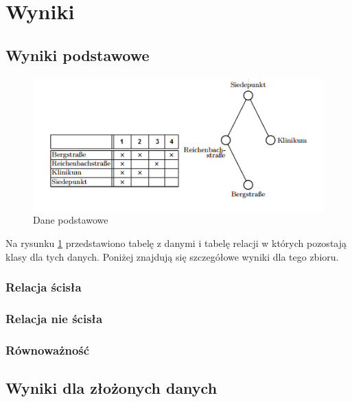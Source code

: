 \documentclass[a4paper,12pt]{article}
\begin{document}
\section{Wyniki}

\subsection{Wyniki podstawowe}

\begin{figure}[h!]
\begin{center}
\includegraphics[width=\textwidth]{img/dane.png}
\caption{Dane podstawowe}
\label{dane_podstawowe}
\end{center}
\end{figure}

Na rysunku \ref{dane_podstawowe} przedstawiono tabelę z danymi i tabelę relacji w których pozostają klasy dla tych danych. Poniżej znajdują się szczegółowe wyniki dla tego zbioru.

\subsubsection{Relacja ścisła}



\subsubsection{Relacja nie ścisła}


\subsubsection{Równoważność}

\subsection{Wyniki dla złożonych danych}
\end{document}
